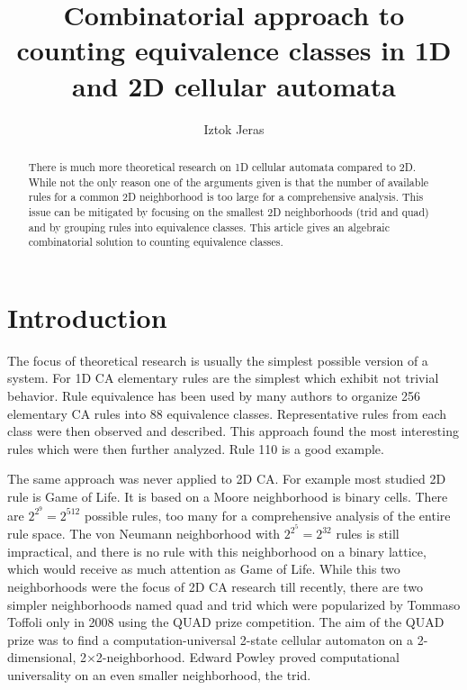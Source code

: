 \documentclass{ijuc}
\begin{document}
\title{Combinatorial approach to counting equivalence classes in 1D and 2D cellular automata}
\author{Iztok Jeras}
\def\received{Received 17 December 2004; In final form 1 April 2005}

\maketitle

\begin{abstract}
There is much more theoretical research on 1D cellular automata compared to 2D.
While not the only reason one of the arguments given is that the number of
available rules for a common 2D neighborhood is too large for a comprehensive
analysis. This issue can be mitigated by focusing on the smallest 2D neighborhoods
(trid and quad) and by grouping rules into equivalence classes. This article
gives an algebraic combinatorial solution to counting equivalence classes.
\end{abstract}


\section{Introduction}

The focus of theoretical research is usually the simplest possible version of a system.
For 1D CA elementary rules are the simplest which exhibit not trivial behavior. Rule
equivalence has been used by many authors to organize 256 elementary CA rules into 88
equivalence classes. Representative rules from each class were then observed and described.
This approach found the most interesting rules which were then further analyzed. Rule 110
is a good example.

The same approach was never applied to 2D CA. For example most studied 2D rule is Game of Life.
It is based on a Moore neighborhood is binary cells. There are $2^{2^9}=2^512$ possible rules,
too many for a comprehensive analysis of the entire rule space. The von Neumann neighborhood
with $2^{2^5}=2^32$ rules is still impractical, and there is no rule with this neighborhood on
a binary lattice, which would receive as much attention as Game of Life. While this two
neighborhoods were the focus of 2D CA research till recently, there are two simpler neighborhoods
named quad and trid which were popularized by Tommaso Toffoli only in 2008 using the QUAD prize competition.
The aim of the QUAD prize was to find a computation-universal 2-state cellular automaton on a 2-dimensional,
2×2-neighborhood. Edward Powley proved computational universality on an even smaller neighborhood, the trid.
\end{document}
